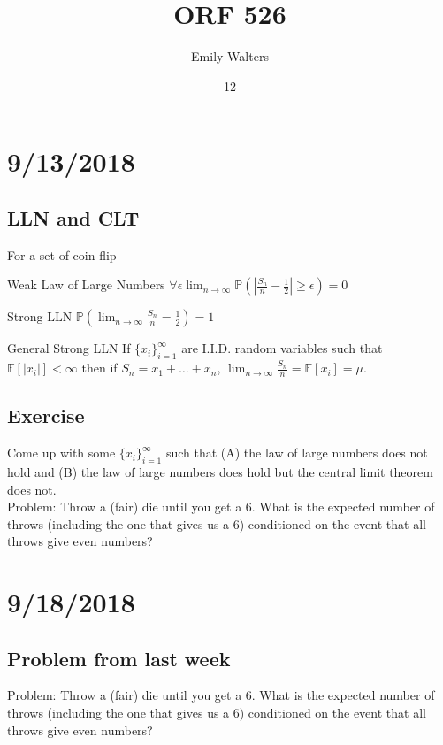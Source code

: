 \documentclass[english, course]{Notes}
\title{ORF 526}
\author{Emily Walters}
\date{12}{09}{2018}
\begin{document}
\section{9/13/2018}

\subsection{LLN and CLT}

For a set of coin flip

\begin{theorem}{Weak Law of Large Numbers}
$\forall \epsilon \lim_{n \to \infty} \mathbb{P}(|\frac{S_n}{n} - \frac{1}{2}| \geq \epsilon) = 0$\\
\end{theorem}

\begin{theorem}{Strong LLN}
	 $\mathbb{P}(\lim_{n \to \infty} \frac{S_n}{n} = \frac{1}{2}) = 1$\\
\end{theorem}

\begin{theorem}{General Strong LLN}
If $\{x_i\}^{\infty}_{i = 1}$ are I.I.D. random variables such that $\mathbb{E}[|x_i|] < \infty$ then if $S_n =x_1 + \dots + x_n$, $\lim_{n \to \infty} \frac{S_n}{n} = \mathbb{E}[x_i] = \mu$.
\end{theorem}

\subsection{Exercise}
Come up with some $\{x_i\}^\infty_{i=1}$ such that (A) the law of large numbers does not hold and (B) the law of large numbers does hold but the central limit theorem does not.\\

Problem: Throw a (fair) die until you get a 6. What is the expected number of throws (including the one that gives us a 6) conditioned on the event that all throws give even numbers?

\section{9/18/2018}

\subsection{Problem from last week}

Problem: Throw a (fair) die until you get a 6. What is the expected number of throws (including the one that gives us a 6) conditioned on the event that all throws give even numbers?
\end{document}
